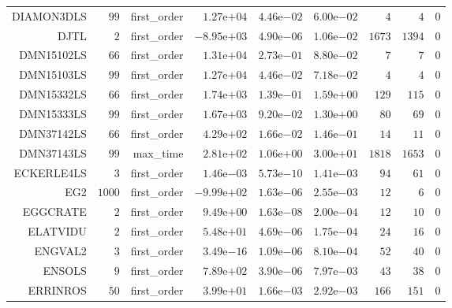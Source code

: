\begin{longtable}{rrrrrrrrr}
DIAMON3DLS & \(    99\) & first\_order & \( 1.27\)e\(+04\) & \( 4.46\)e\(-02\) & \( 6.00\)e\(-02\) & \(     4\) & \(     4\) & \(     0\) \\
DJTL & \(     2\) & first\_order & \(-8.95\)e\(+03\) & \( 4.90\)e\(-06\) & \( 1.06\)e\(-02\) & \(  1673\) & \(  1394\) & \(     0\) \\
DMN15102LS & \(    66\) & first\_order & \( 1.31\)e\(+04\) & \( 2.73\)e\(-01\) & \( 8.80\)e\(-02\) & \(     7\) & \(     7\) & \(     0\) \\
DMN15103LS & \(    99\) & first\_order & \( 1.27\)e\(+04\) & \( 4.46\)e\(-02\) & \( 7.18\)e\(-02\) & \(     4\) & \(     4\) & \(     0\) \\
DMN15332LS & \(    66\) & first\_order & \( 1.74\)e\(+03\) & \( 1.39\)e\(-01\) & \( 1.59\)e\(+00\) & \(   129\) & \(   115\) & \(     0\) \\
DMN15333LS & \(    99\) & first\_order & \( 1.67\)e\(+03\) & \( 9.20\)e\(-02\) & \( 1.30\)e\(+00\) & \(    80\) & \(    69\) & \(     0\) \\
DMN37142LS & \(    66\) & first\_order & \( 4.29\)e\(+02\) & \( 1.66\)e\(-02\) & \( 1.46\)e\(-01\) & \(    14\) & \(    11\) & \(     0\) \\
DMN37143LS & \(    99\) & max\_time & \( 2.81\)e\(+02\) & \( 1.06\)e\(+00\) & \( 3.00\)e\(+01\) & \(  1818\) & \(  1653\) & \(     0\) \\
ECKERLE4LS & \(     3\) & first\_order & \( 1.46\)e\(-03\) & \( 5.73\)e\(-10\) & \( 1.41\)e\(-03\) & \(    94\) & \(    61\) & \(     0\) \\
EG2 & \(  1000\) & first\_order & \(-9.99\)e\(+02\) & \( 1.63\)e\(-06\) & \( 2.55\)e\(-03\) & \(    12\) & \(     6\) & \(     0\) \\
EGGCRATE & \(     2\) & first\_order & \( 9.49\)e\(+00\) & \( 1.63\)e\(-08\) & \( 2.00\)e\(-04\) & \(    12\) & \(    10\) & \(     0\) \\
ELATVIDU & \(     2\) & first\_order & \( 5.48\)e\(+01\) & \( 4.69\)e\(-06\) & \( 1.75\)e\(-04\) & \(    24\) & \(    16\) & \(     0\) \\
ENGVAL2 & \(     3\) & first\_order & \( 3.49\)e\(-16\) & \( 1.09\)e\(-06\) & \( 8.10\)e\(-04\) & \(    52\) & \(    40\) & \(     0\) \\
ENSOLS & \(     9\) & first\_order & \( 7.89\)e\(+02\) & \( 3.90\)e\(-06\) & \( 7.97\)e\(-03\) & \(    43\) & \(    38\) & \(     0\) \\
ERRINROS & \(    50\) & first\_order & \( 3.99\)e\(+01\) & \( 1.66\)e\(-03\) & \( 2.92\)e\(-03\) & \(   166\) & \(   151\) & \(     0\) \\

\end{longtable}
